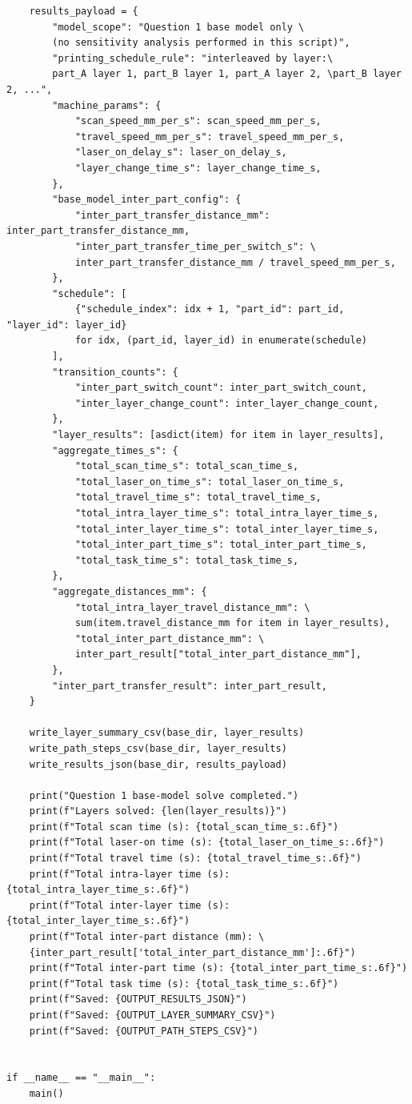 \documentclass[a4paper, 12pt]{ctexart}
\begin{document}
\begin{verbatim}
    results_payload = {
        "model_scope": "Question 1 base model only \
        (no sensitivity analysis performed in this script)",
        "printing_schedule_rule": "interleaved by layer:\
        part_A layer 1, part_B layer 1, part_A layer 2, \part_B layer 2, ...",
        "machine_params": {
            "scan_speed_mm_per_s": scan_speed_mm_per_s,
            "travel_speed_mm_per_s": travel_speed_mm_per_s,
            "laser_on_delay_s": laser_on_delay_s,
            "layer_change_time_s": layer_change_time_s,
        },
        "base_model_inter_part_config": {
            "inter_part_transfer_distance_mm": inter_part_transfer_distance_mm,
            "inter_part_transfer_time_per_switch_s": \
            inter_part_transfer_distance_mm / travel_speed_mm_per_s,
        },
        "schedule": [
            {"schedule_index": idx + 1, "part_id": part_id, "layer_id": layer_id}
            for idx, (part_id, layer_id) in enumerate(schedule)
        ],
        "transition_counts": {
            "inter_part_switch_count": inter_part_switch_count,
            "inter_layer_change_count": inter_layer_change_count,
        },
        "layer_results": [asdict(item) for item in layer_results],
        "aggregate_times_s": {
            "total_scan_time_s": total_scan_time_s,
            "total_laser_on_time_s": total_laser_on_time_s,
            "total_travel_time_s": total_travel_time_s,
            "total_intra_layer_time_s": total_intra_layer_time_s,
            "total_inter_layer_time_s": total_inter_layer_time_s,
            "total_inter_part_time_s": total_inter_part_time_s,
            "total_task_time_s": total_task_time_s,
        },
        "aggregate_distances_mm": {
            "total_intra_layer_travel_distance_mm": \
            sum(item.travel_distance_mm for item in layer_results),
            "total_inter_part_distance_mm": \
            inter_part_result["total_inter_part_distance_mm"],
        },
        "inter_part_transfer_result": inter_part_result,
    }

    write_layer_summary_csv(base_dir, layer_results)
    write_path_steps_csv(base_dir, layer_results)
    write_results_json(base_dir, results_payload)

    print("Question 1 base-model solve completed.")
    print(f"Layers solved: {len(layer_results)}")
    print(f"Total scan time (s): {total_scan_time_s:.6f}")
    print(f"Total laser-on time (s): {total_laser_on_time_s:.6f}")
    print(f"Total travel time (s): {total_travel_time_s:.6f}")
    print(f"Total intra-layer time (s): {total_intra_layer_time_s:.6f}")
    print(f"Total inter-layer time (s): {total_inter_layer_time_s:.6f}")
    print(f"Total inter-part distance (mm): \
    {inter_part_result['total_inter_part_distance_mm']:.6f}")
    print(f"Total inter-part time (s): {total_inter_part_time_s:.6f}")
    print(f"Total task time (s): {total_task_time_s:.6f}")
    print(f"Saved: {OUTPUT_RESULTS_JSON}")
    print(f"Saved: {OUTPUT_LAYER_SUMMARY_CSV}")
    print(f"Saved: {OUTPUT_PATH_STEPS_CSV}")


if __name__ == "__main__":
    main()

\end{verbatim}
\end{document}

